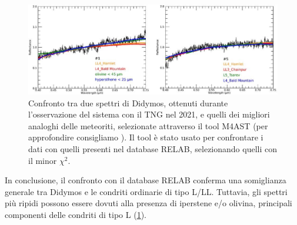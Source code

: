\documentclass[a4paper,11pt,openright]{book}
\begin{document}
\begin{figure}[!h]
    \centering
    \includegraphics[scale=0.96]{figure/Ieva et al.jpg}
    \caption[Confronto tra spettri di Didymos e analoghi delle meteoriti.]{Confronto tra due spettri di Didymos, ottenuti durante l'osservazione del sistema con il TNG nel 2021, e quelli dei migliori analoghi delle meteoriti, selezionate attraverso il tool M4AST (per approfondire consigliamo \cite{popescu_modelling_2012}). Il tool è stato usato per confrontare i dati con quelli presenti nel database RELAB, selezionando quelli con il minor $\chi^2$. \citep{ieva_spectral_2022}}
    \label{fig:ieva_spectra}
\end{figure}

In conclusione, il confronto con il database RELAB conferma una somiglianza generale tra Didymos e le condriti ordinarie di tipo L/LL. Tuttavia, gli spettri più ripidi possono essere dovuti alla presenza di iperstene e/o olivina, principali componenti delle condriti di tipo L (\cref{fig:ieva_spectra}).
\end{document}
